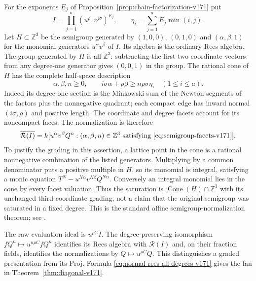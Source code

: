 \documentclass[11pt,reqno]{amsart}
\numberwithin{equation}{section}
\theoremstyle{definition}\newtheorem{definition}[theorem]{Definition}
\theoremstyle{remark}\newtheorem{remark}[theorem]{Remark}
\begin{document}
For the exponents $E_j$ of Proposition~\ref{prop:chain-factorization-v171}
put
\[
 I=\prod_{j=1}^a(u^\rho,v^{j\sigma})^{E_j},\qquad
 \eta_i=\sum_{j=1}^aE_j\min(i,j).
\]
Let $H\subset\mathbb Z^3$ be the semigroup generated by $(1,0,0)$,
$(0,1,0)$ and $(\alpha,\beta,1)$ for the monomial generators
$u^\alpha v^\beta$ of $I$. Its algebra is the ordinary Rees algebra.
The group generated by $H$ is all $\mathbb Z^3$: subtracting the
first two coordinate vectors from any degree-one generator gives
$(0,0,1)$ in the group. The rational cone of $H$ has the complete
half-space description
\begin{equation}\label{eq:semigroup-facets-v171}
 \alpha,\beta,n\geq0,\qquad
 i\sigma\alpha+\rho\beta\geq n\rho\sigma\eta_i
       \quad(1\leq i\leq a).
\end{equation}
Indeed its degree-one section is the Minkowski sum of the Newton
segments of the factors plus the nonnegative quadrant; each compact
edge has inward normal $(i\sigma,\rho)$ and positive length.
The coordinate and degree facets account for its noncompact faces.
The normalization is therefore
\begin{equation}\label{eq:normal-rees-all-degrees-v171}
 \overline{\mathcal R(I)}
 =k[u^\alpha v^\beta Q^n:(\alpha,\beta,n)\in
                       \mathbb Z^3\text{ satisfying }
                       \eqref{eq:semigroup-facets-v171}].
\end{equation}
To justify the grading in this assertion, a lattice point in the cone
is a rational nonnegative combination of the listed generators.
Multiplying by a common denominator puts a positive multiple in
$H$, so its monomial is integral, satisfying a monic equation
$T^N-u^{N\alpha}v^{N\beta}Q^{Nn}$. Conversely an integral monomial
lies in the cone by every facet valuation. Thus the saturation is
$\operatorname{Cone}(H)\cap\mathbb Z^3$ with its unchanged third-coordinate
grading, not a claim that the original semigroup was saturated in a
fixed degree. This is the standard affine semigroup-normalization
theorem; see \cite[Chapters 1 and 5]{HunekeSwanson171}.

The raw evaluation ideal is $u^{\rho C}I$. The degree-preserving
isomorphism $fQ^n\mapsto u^{n\rho C}fQ^n$ identifies its Rees algebra
with $\mathcal R(I)$ and, on their fraction fields, identifies the
normalizations by $Q\mapsto u^{\rho C}Q$. This distinguishes a graded
presentation from its Proj. Formula \eqref{eq:normal-rees-all-degrees-v171}
gives the fan in Theorem~\ref{thm:diagonal-v171}.
\end{document}
